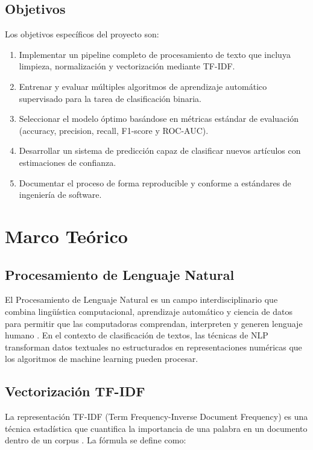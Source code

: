 \documentclass[12pt,a4paper]{article}
\begin{document}
\subsection{Objetivos}

Los objetivos específicos del proyecto son:

\begin{enumerate}
    \item Implementar un pipeline completo de procesamiento de texto que incluya limpieza, normalización y vectorización mediante TF-IDF.
    \item Entrenar y evaluar múltiples algoritmos de aprendizaje automático supervisado para la tarea de clasificación binaria.
    \item Seleccionar el modelo óptimo basándose en métricas estándar de evaluación (accuracy, precision, recall, F1-score y ROC-AUC).
    \item Desarrollar un sistema de predicción capaz de clasificar nuevos artículos con estimaciones de confianza.
    \item Documentar el proceso de forma reproducible y conforme a estándares de ingeniería de software.
\end{enumerate}

\section{Marco Teórico}

\subsection{Procesamiento de Lenguaje Natural}

El Procesamiento de Lenguaje Natural es un campo interdisciplinario que combina lingüística computacional, aprendizaje automático y ciencia de datos para permitir que las computadoras comprendan, interpreten y generen lenguaje humano \cite{jurafsky2019}. En el contexto de clasificación de textos, las técnicas de NLP transforman datos textuales no estructurados en representaciones numéricas que los algoritmos de machine learning pueden procesar.

\subsection{Vectorización TF-IDF}

La representación TF-IDF (Term Frequency-Inverse Document Frequency) es una técnica estadística que cuantifica la importancia de una palabra en un documento dentro de un corpus \cite{sparck1972}. La fórmula se define como:
\end{document}
